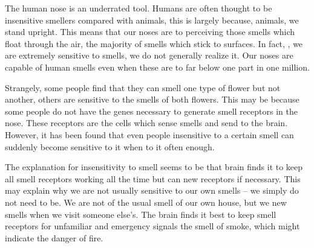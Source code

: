 
\qquad The human nose is an underrated tool. Humans are often thought to be insensitive smellers compared with animals, \underline{\quad} this is largely because, \underline{\quad} animals, we stand upright. This means that our noses are \underline{\quad} to perceiving those smells which float through the air, \underline{\quad} the majority of smells which stick to surfaces. In fact, \underline{\quad}, we are extremely sensitive to smells, \underline{\quad} we do not generally realize it. Our noses are capable of \underline{\quad} human smells even when these are \underline{\quad} to far below one part in one million.

\qquad Strangely, some people find that they can smell one type of flower but not another, \underline{\quad} others are sensitive to the smells of both flowers. This may be because some people do not have the genes necessary to generate \underline{\quad} smell receptors in the nose. These receptors are the cells which sense smells and send \underline{\quad} to the brain. However, it has been found that even people insensitive to a certain smell \underline{\quad} can suddenly become sensitive to it when \underline{\quad} to it often enough.

\qquad The explanation for insensitivity to smell seems to be that brain finds it \underline{\quad} to keep all smell receptors working all the time but can \underline{\quad} new receptors if necessary. This may \underline{\quad} explain why we are not usually sensitive to our own smells -- we simply do not need to be. We are not \underline{\quad} of the usual smell of our own house, but we \underline{\quad} new smells when we visit someone else's. The brain finds it best to keep smell receptors \underline{\quad} for unfamiliar and emergency signals \underline{\quad} the smell of smoke, which might indicate the danger of fire.

\vspace{6pt}

